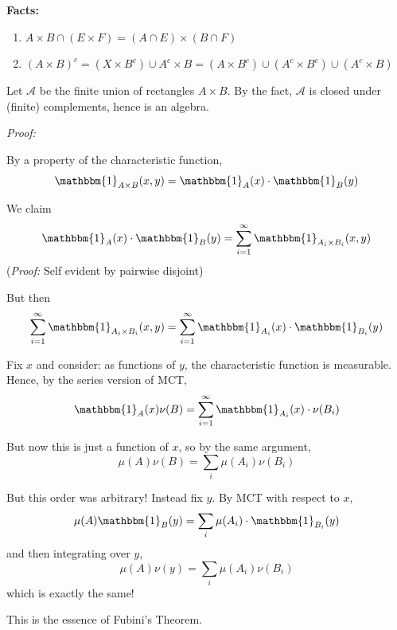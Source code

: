 \documentclass[12pt]{report}
\newcommand{\ind}{\mathbbm{1}}
\newcommand{\A}{\mathcal{A}}
\newcommand{\M}{\mathcal{M}}
\newcommand{\Nc}{\mathcal{N}}
\newcommand*{\tbf}[1]{\ifmmode\mathbf{#1}\else\textbf{#1}\fi}
\newenvironment*{tbox}[2][gray]{
    \begin{tcolorbox}[
        parbox=false,
        colback=#1!5!white,
        colframe=#1!75!black,
        breakable,
        title={#2}
    ]}
    {\end{tcolorbox}}
\begin{document}
        \tbf{Facts:} 
        \begin{enumerate}
            \item $A \times B \cap (E \times F) = (A \cap E) \times (B \cap F)$
            \item $(A \times B)^c = (X \times B^c) \cup A^c \times B = (A \times B^c) \cup (A^c \times B^c) \cup (A^c \times B)$
        \end{enumerate}

        Let $\A$ be the finite union of rectangles $A \times B$. By the fact, $\A$ is closed under (finite) complements, hence is an algebra. 

        \begin{tbox}{\textbf{Lemma:} Assume for $A \in \M$, $B \in \Nc$ with $\mu(A), \mu(B) < \infty$, 
            \[A \times B = \bigcup_{i=1}^\infty A_i \times B_i\]
            with $(A_i \times B_i) \cap (A_j \times B_j) = \emptyset$ for $i \neq j$. Then
            \[\mu(A)\nu(B) = \sum_{i=1}^{\infty} \mu(A_i) \nu(B_i)\]}
            \emph{Proof:} 

            By a property of the characteristic function, 
            \[\ind_{A \times B}(x, y) = \ind_A(x) \cdot \ind_B(y)\]

            We claim 
            \[\ind_A(x) \cdot \ind_B(y) = \sum_{i=1}^{\infty} \ind_{A_i \times B_i}(x, y)\]
            (\emph{Proof:} Self evident by pairwise disjoint) 

            But then 
            \[\sum_{i=1}^{\infty} \ind_{A_i \times B_i}(x, y) = \sum_{i=1}^\infty \ind_{A_i}(x) \cdot \ind_{B_i}(y)\]

            Fix $x$ and consider: as functions of $y$, the characteristic function is measurable. Hence, by the series version of MCT, 
            \[\ind_A(x) \nu(B) = \sum_{i=1}^\infty \ind_{A_i}(x) \cdot \nu(B_i)\]

            But now this is just a function of $x$, so by the same argument,
            \[\mu(A) \nu(B) = \sum_i \mu(A_i) \nu(B_i)\]

            But this order was arbitrary! Instead fix $y$. By MCT with respect to $x$, 
            \[\mu(A) \ind_B(y) = \sum_i \mu(A_i) \cdot \ind_{B_i}(y)\]
            and then integrating over $y$, 
            \[\mu(A) \nu(y) = \sum_i \mu(A_i) \nu(B_i)\]
            which is exactly the same! 

            This is the essence of Fubini's Theorem.
        \end{tbox}
\end{document}
